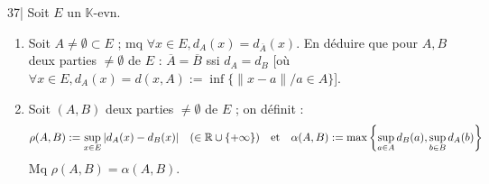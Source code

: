 
\begin{statementbox}
37| Soit $E$ un $\mathbb{K}$-evn.
\begin{enumerate}[label=\alph*)]
  \item Soit $A \neq \emptyset \subset E$ ; mq $\forall x \in E, d_A(x) = d_{\overline{A}}(x)$. En déduire que pour $A, B$ deux parties $\neq \emptyset$ de $E$ : $\overline{A} = \overline{B}$ ssi $d_A = d_B$ [où $\forall x \in E, d_A(x) = d(x, A) := \inf \{\|x - a\| / a \in A\}$].
  \item Soit $(A, B)$ deux parties $\neq \emptyset$ de $E$ ; on définit :
  \[ \rho(A, B) := \sup_{x \in E} |d_A(x) - d_B(x)| \quad (\in \mathbb R \cup \{+\infty\}) \quad \text{et} \quad \alpha(A, B) := \max \left\{ \sup_{a \in A} d_B(a), \sup_{b \in B} d_A(b) \right\} \]
  Mq $\rho(A, B) = \alpha(A, B)$.
\end{enumerate}
\end{statementbox}

